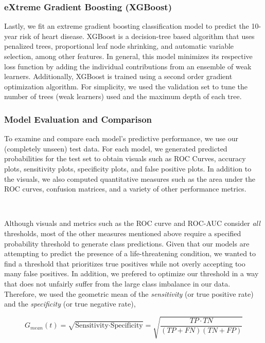 \documentclass[10pt]{article}
\begin{document}
\subsubsection*{eXtreme Gradient Boosting (XGBoost)}

Lastly, we fit an extreme gradient boosting classification model to predict the 10-year risk of heart disease. XGBoost is a decision-tree based algorithm that uses penalized trees, proportional leaf node shrinking, and automatic variable selection, among other features. In general, this model minimizes its respective loss function by adding the individual contributions from an ensemble of weak learners. Additionally, XGBoost is trained using a second order gradient optimization algorithm. For simplicity, we used the validation set to tune the number of trees (weak learners) used and the maximum depth of each tree.

\subsubsection*{Model Evaluation and Comparison}

To examine and compare each model's predictive performance, we use our (completely unseen) test data. For each model, we generated predicted probabilities for the test set to obtain visuals such as ROC Curves, accuracy plots, sensitivity plots, specificity plots, and false positive plots. In addition to the visuals, we also computed quantitative measures such as the area under the ROC curves, confusion matrices, and a variety of other performance metrics. 

\

Although visuals and metrics such as the ROC curve and ROC-AUC consider \textit{all} thresholds, most of the other measures mentioned above require a specified probability threshold to generate class predictions. Given that our models are attempting to predict the presence of a life-threatening condition, we wanted to find a threshold that prioritizes true positives while not overly accepting too many false positives. In addition, we prefered to optimize our threshold in a way that does not unfairly suffer from the large class imbalance in our data. Therefore, we used the geometric mean of the \textit{sensitivity} (or true positive rate) and the \textit{specificity} (or true negative rate), 

$$G_{mean}(t) = \sqrt{\text{Sensitivity} \cdot \text{Specificity}} = \sqrt{\frac{TP \cdot TN }{(TP + FN)(TN + FP)}}$$
\end{document}
